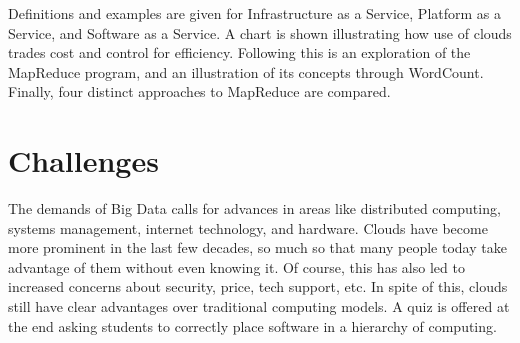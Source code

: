 Definitions and examples are given for Infrastructure as a Service,
Platform as a Service, and Software as a Service. A chart is shown
illustrating how use of clouds trades cost and control for efficiency.
Following this is an exploration of the MapReduce program, and an
illustration of its concepts through WordCount. Finally, four distinct
approaches to MapReduce are compared.



\section{Challenges}

The demands of Big Data calls for advances in areas like distributed
computing, systems management, internet technology, and hardware. Clouds
have become more prominent in the last few decades, so much so that many
people today take advantage of them without even knowing it. Of course,
this has also led to increased concerns about security, price, tech
support, etc. In spite of this, clouds still have clear advantages over
traditional computing models. A quiz is offered at the end asking
students to correctly place software in a hierarchy of computing.


